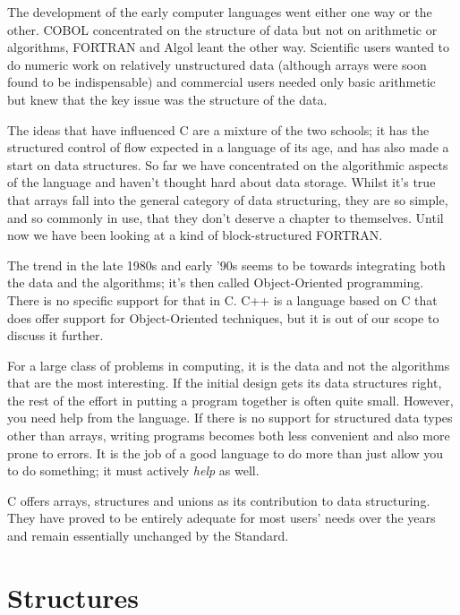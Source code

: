   

  The development of the early computer languages went either one way or the
   other. COBOL concentrated on the structure of data but not on arithmetic or
   algorithms, FORTRAN and Algol leant the other way. Scientific users wanted
   to do numeric work on relatively unstructured data (although arrays were
   soon found to be indispensable) and commercial users needed only basic
   arithmetic but knew that the key issue was the structure of the data.


  The ideas that have influenced C are a mixture of the two schools; it has
   the structured control of flow expected in a language of its age, and has
   also made a start on data structures. So far we have concentrated on the
   algorithmic aspects of the language and haven't thought hard about data
   storage. Whilst it's true that arrays fall into the general category of data
   structuring, they are so simple, and so commonly in use, that they don't
   deserve a chapter to themselves. Until now we have been looking at a kind of
   block-structured FORTRAN.


  The trend in the late 1980s and early '90s seems to be towards integrating
   both the data and the algorithms; it's then called Object-Oriented
   programming. There is no specific support for that in C. C++ is a language
   based on C that does offer support for Object-Oriented techniques, but it is
   out of our scope to discuss it further.


  For a large class of problems in computing, it is the data and not the
   algorithms that are the most interesting. If the initial design gets its
   data structures right, the rest of the effort in putting a program together
   is often quite small. However, you need help from the language. If there is
   no support for structured data types other than arrays, writing programs
   becomes both less convenient and also more prone to errors. It is the job of
   a good language to do more than just allow you to do something; it must
   actively \textit{help} as well.


  C offers arrays, structures and unions as its contribution to data
   structuring. They have proved to be entirely adequate for most users' needs
   over the years and remain essentially unchanged by the Standard.


 
        \section{Structures}
        

